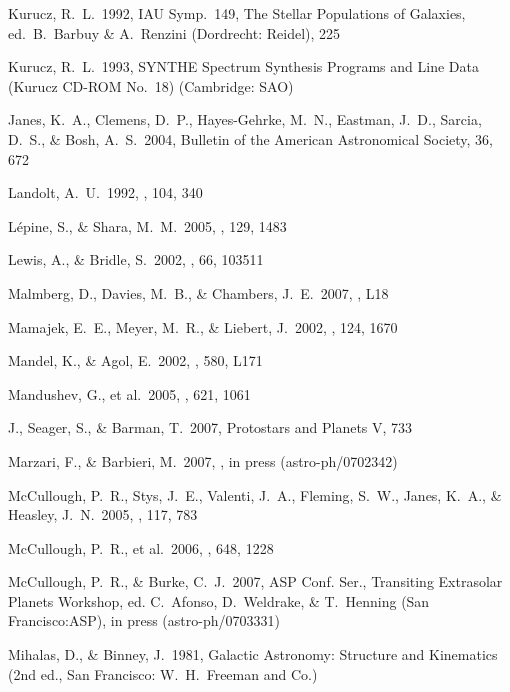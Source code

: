\documentclass{emulateapj}
\begin{document}
\begin{thebibliography}
 Kurucz, R.~L.\ 1992, IAU 
Symp.~149, The Stellar Populations of Galaxies, ed.\ B.~Barbuy \& A.~Renzini (Dordrecht: Reidel), 225 

 Kurucz, R.~L.\ 1993, SYNTHE 
Spectrum Synthesis Programs and Line Data (Kurucz CD-ROM No.~18) (Cambridge: SAO)

 Janes, K.~A., Clemens, 
D.~P., Hayes-Gehrke, M.~N., Eastman, J.~D., Sarcia, D.~S., \& Bosh, A.~S.\ 
2004, Bulletin of the American Astronomical Society, 36, 672 

 Landolt, A.~U.\ 1992, \aj, 
104, 340 

 L{\'e}pine, S., \& 
Shara, M.~M.\ 2005, \aj, 129, 1483

 Lewis, A., \& Bridle, 
S.\ 2002, \prd, 66, 103511 


 Malmberg, D., Davies, 
M.~B., \& Chambers, J.~E.\ 2007, \mnras, L18

 Mamajek, E.~E., Meyer, 
M.~R., \& Liebert, J.\ 2002, \aj, 124, 1670

 Mandel, K., \& Agol, 
E.\ 2002, \apjl, 580, L171 

 Mandushev, G., et 
al.\ 2005, \apj, 621, 1061 

J., Seager, S., \& Barman, T.\ 2007, Protostars and Planets V, 733 

 Marzari, F., \& 
Barbieri, M.\ 2007, \aap, in press (astro-ph/0702342)

 McCullough, P.~R., 
Stys, J.~E., Valenti, J.~A., Fleming, S.~W., Janes, K.~A., \& Heasley, 
J.~N.\ 2005, \pasp, 117, 783 

 McCullough, P.~R., 
et al.\ 2006, \apj, 648, 1228 

 McCullough, P.~R., 
\& Burke, C.~J.\ 2007, ASP Conf. Ser., Transiting Extrasolar Planets Workshop, ed. C.\ Afonso, D.\ Weldrake, \& T.\ Henning (San Francisco:ASP), in press (astro-ph/0703331) 

 Mihalas, D., \& 
Binney, J.\ 1981, Galactic Astronomy: Structure and Kinematics (2nd ed., San Francisco: W.~H.~Freeman and Co.)


\end{thebibliography}
\end{document}

